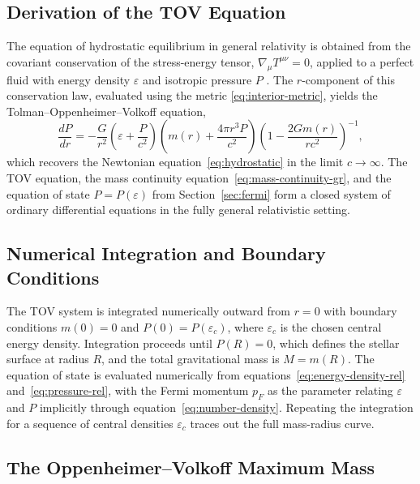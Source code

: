 \subsection{Derivation of the TOV Equation}
 
The equation of hydrostatic equilibrium in general relativity is obtained
from the covariant conservation of the stress-energy tensor,
$\nabla_\mu T^{\mu\nu} = 0$, applied to a perfect fluid with energy
density $\varepsilon$ and isotropic pressure $P$ \cite{Tolman1939,
Oppy}. The $r$-component of this conservation law, evaluated
using the metric \eqref{eq:interior-metric}, yields the
Tolman--Oppenheimer--Volkoff equation,
%
\begin{equation}
    \frac{dP}{dr} = -\frac{G}{r^2}
    \left(\varepsilon + \frac{P}{c^2}\right)
    \left(m(r) + \frac{4\pi r^3 P}{c^2}\right)
    \left(1 - \frac{2Gm(r)}{rc^2}\right)^{-1},
    \label{eq:tov}
\end{equation}
%
which recovers the Newtonian equation~\eqref{eq:hydrostatic} in the
limit $c \to \infty$. The TOV equation, the mass continuity
equation~\eqref{eq:mass-continuity-gr}, and the equation of state
$P = P(\varepsilon)$ from Section~\ref{sec:fermi} form a closed system
of ordinary differential equations in the fully general relativistic
setting.

\subsection{Numerical Integration and Boundary Conditions}
 
The TOV system is integrated numerically outward from $r = 0$ with
boundary conditions $m(0) = 0$ and $P(0) = P(\varepsilon_c)$, where
$\varepsilon_c$ is the chosen central energy density. Integration
proceeds until $P(R) = 0$, which defines the stellar surface at radius
$R$, and the total gravitational mass is $M = m(R)$. The equation of
state is evaluated numerically from
equations~\eqref{eq:energy-density-rel} and~\eqref{eq:pressure-rel},
with the Fermi momentum $p_F$ as the parameter relating $\varepsilon$
and $P$ implicitly through equation~\eqref{eq:number-density}.
Repeating the integration for a sequence of central densities
$\varepsilon_c$ traces out the full mass-radius curve.


\subsection{The Oppenheimer--Volkoff Maximum Mass}

